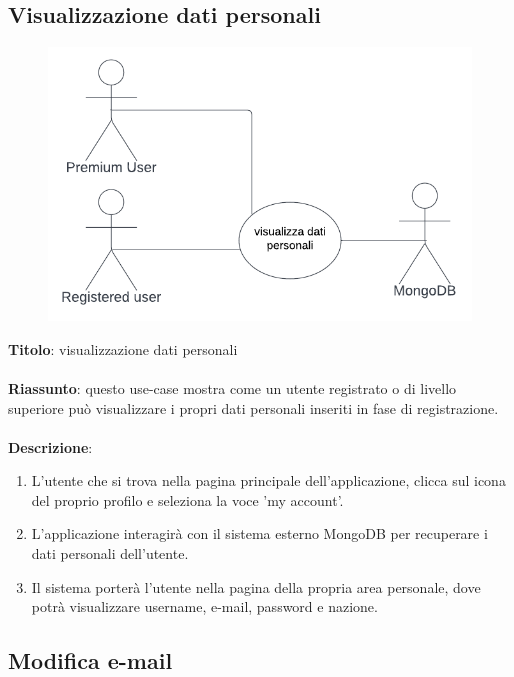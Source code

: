 \subsection{Visualizzazione dati personali} \label{req_visualizzazione_dati_personali}
\begin{figure}[!h]
\centering
\includegraphics[scale=0.35]{images/use_case_visualizza_dati_personali.png}
\end{figure}
\noindent
\textbf{Titolo}: visualizzazione dati personali \\
\\
\textbf{Riassunto}: questo use-case mostra come un utente registrato o di livello superiore può visualizzare i propri dati personali inseriti in fase di registrazione. \\
\\
\textbf{Descrizione}:
\begin{enumerate}
    \item L'utente che si trova nella pagina principale dell'applicazione, clicca sul icona del proprio profilo e seleziona la voce 'my account'.
    \item L'applicazione interagirà con il sistema esterno MongoDB per recuperare i dati personali dell'utente.
    \item Il sistema porterà l'utente nella pagina della propria area personale, dove potrà visualizzare username, e-mail, password e nazione.
\end{enumerate}

\subsection{Modifica e-mail} \label{req_modifica_e-mail}

